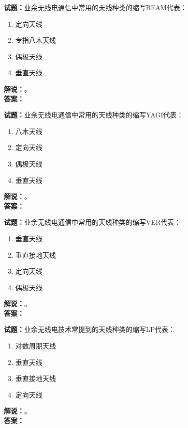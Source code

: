 \documentclass{ctexbook}
\begin{document}
\vspace{\baselineskip}

\noindent\textbf{试题：}业余无线电通信中常用的天线种类的缩写BEAM代表：
\begin{enumerate}[leftmargin=3em]
  \item 定向天线
  \item 专指八木天线
  \item 偶极天线
  \item 垂直天线
\end{enumerate}
\noindent\textbf{解说：}\textbf{}。\\\noindent\textbf{答案：}

\vspace{\baselineskip}

\noindent\textbf{试题：}业余无线电通信中常用的天线种类的缩写YAGI代表：
\begin{enumerate}[leftmargin=3em]
  \item 八木天线
  \item 定向天线
  \item 偶极天线
  \item 垂直天线
\end{enumerate}
\noindent\textbf{解说：}\textbf{}。\\\noindent\textbf{答案：}

\vspace{\baselineskip}

\noindent\textbf{试题：}业余无线电通信中常用的天线种类的缩写VER代表：
\begin{enumerate}[leftmargin=3em]
  \item 垂直天线
  \item 垂直接地天线
  \item 定向天线
  \item 偶极天线
\end{enumerate}
\noindent\textbf{解说：}\textbf{}。\\\noindent\textbf{答案：}

\vspace{\baselineskip}

\noindent\textbf{试题：}业余无线电技术常提到的天线种类的缩写LP代表：
\begin{enumerate}[leftmargin=3em]
  \item 对数周期天线
  \item 垂直天线
  \item 垂直接地天线
  \item 定向天线
\end{enumerate}
\noindent\textbf{解说：}\textbf{}。\\\noindent\textbf{答案：}
\end{document}
